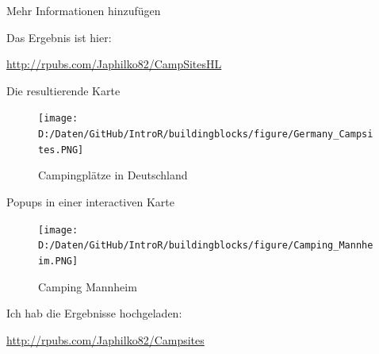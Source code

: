 \documentclass[ignorenonframetext,]{beamer}
\newenvironment{Shaded}{\begin{snugshade}}{\end{snugshade}}
\newcommand{\KeywordTok}[1]{\textcolor[rgb]{0.26,0.66,0.93}{\textbf{#1}}}
\newcommand{\DataTypeTok}[1]{\textcolor[rgb]{0.74,0.68,0.62}{\underline{#1}}}
\newcommand{\CharTok}[1]{\textcolor[rgb]{0.02,0.61,0.04}{#1}}
\newcommand{\StringTok}[1]{\textcolor[rgb]{0.02,0.61,0.04}{#1}}
\newcommand{\CommentTok}[1]{\textcolor[rgb]{0.00,0.40,1.00}{\textit{#1}}}
\newcommand{\OperatorTok}[1]{\textcolor[rgb]{0.74,0.68,0.62}{#1}}
\newcommand{\NormalTok}[1]{\textcolor[rgb]{0.74,0.68,0.62}{#1}}
\begin{document}
\begin{frame}[fragile]{Mehr Informationen hinzufügen}

\begin{Shaded}
\end{Shaded}

\begin{Shaded}
\end{Shaded}

Das Ergebnis ist hier:

\url{http://rpubs.com/Japhilko82/CampSitesHL}

\end{frame}

\begin{frame}{Die resultierende Karte}

\begin{figure}
\centering
\texttt{[image: D:/Daten/GitHub/IntroR/buildingblocks/figure/Germany\_Campsites.PNG]}
\caption{Campingplätze in Deutschland}
\end{figure}

\end{frame}

\begin{frame}{Popups in einer interactiven Karte}

\begin{figure}
\centering
\texttt{[image: D:/Daten/GitHub/IntroR/buildingblocks/figure/Camping\_Mannheim.PNG]}
\caption{Camping Mannheim}
\end{figure}

Ich hab die Ergebnisse hochgeladen:

\url{http://rpubs.com/Japhilko82/Campsites}

\end{frame}
\end{document}
